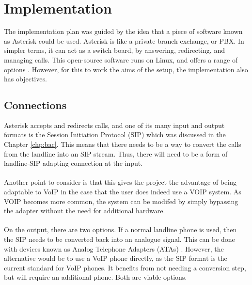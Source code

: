 \documentclass[main.tex]{subfiles}
\begin{document}
\section{Implementation}
The implementation plan was guided by the idea that a piece of software known as Asterisk could be used. Asterisk is like a private branch exchange, or PBX. In simpler terms, it can act as a switch board, by answering, redirecting, and managing calls. This open-source software runs on Linux, and offers a range of options \cite{asterisk-story}. However, for this to work the aims of the setup, the implementation also has objectives.

\subsection{Connections}
Asterisk accepts and redirects calls, and one of its many input and output formats is the Session Initiation Protocol (SIP) \cite{sip} which was discussed in the Chapter \ref{chp:bac}. This means that there needs to be a way to convert the calls from the landline into an SIP stream. Thus, there will need to be a form of landline-SIP adapting connection at the input.
\\\\
Another point to consider is that this gives the project the advantage of being adaptable to VoIP in the case that the user does indeed use a VOIP system. As VOIP becomes more common, the system can be modifed by simply bypassing the adapter without the need for additional hardware.
\\\\
On the output, there are two options. If a normal landline phone is used, then the SIP needs to be converted back into an analogue signal. This can be done with devices known as Analog Telephone Adapters (ATAs) \cite{ata}. However, the alternative would be to use a VoIP phone directly, as the SIP format is the current standard for VoIP phones. It benefits from not needing a conversion step, but will require an additional phone. Both are viable options.
\end{document}
